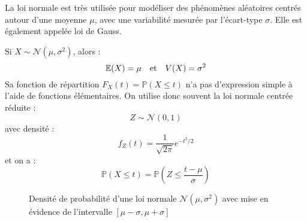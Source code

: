 La loi normale est très utilisée pour modéliser des phénomènes aléatoires centrés autour d'une moyenne $\mu$, 
avec une variabilité mesurée par l’écart-type $\sigma$. Elle est également appelée loi de Gauss.

\begin{proposition}
    Si $X \sim \mathcal{N}(\mu, \sigma^2)$, alors :
        \[ \mathbb{E}(X) = \mu \quad \text{et} \quad V(X) = \sigma^2 \]
    Sa fonction de répartition $F_X(t) = \mathbb{P}(X \leqslant t)$ n’a pas d’expression simple à l’aide de fonctions élémentaires. On utilise donc souvent la loi normale centrée réduite :
        \[ Z \sim \mathcal{N}(0, 1) \]
    avec densité : 
        \[ f_Z(t) = \dfrac{1}{\sqrt{2\pi}} e^{-t^2/2} \]
    et on a :
        \[ \mathbb{P}(X \leqslant t) = \mathbb{P}\left(Z \leq \dfrac{t - \mu}{\sigma}\right) \]
\end{proposition}

\begin{figure}[h]
    \centering
    \caption{Densité de probabilité d'une loi normale $\mathcal{N}(\mu, \sigma^2)$ avec mise en évidence de l'intervalle $[\mu - \sigma, \mu + \sigma]$}
\end{figure}

